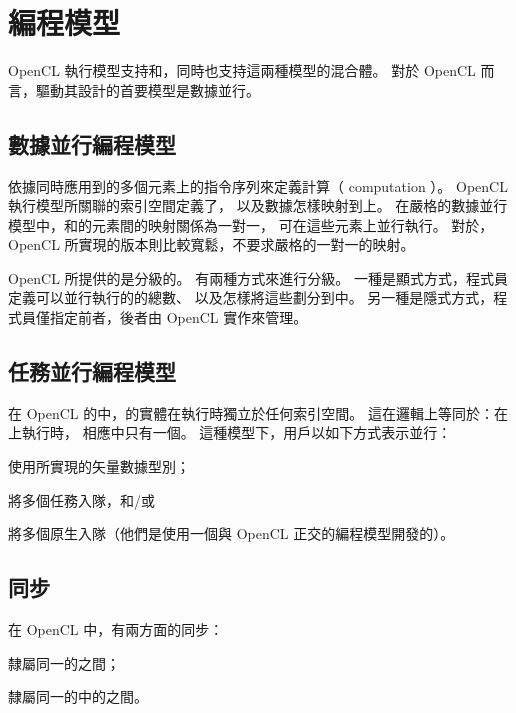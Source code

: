 \section{編程模型}
OpenCL 執行模型支持和，同時也支持這兩種模型的混合體。
對於 OpenCL 而言，驅動其設計的首要模型是數據並行。

\subsection{數據並行編程模型}

依據同時應用到的多個元素上的指令序列來定義計算（ computation ）。
OpenCL 執行模型所關聯的索引空間定義了，
以及數據怎樣映射到上。
在嚴格的數據並行模型中，和的元素間的映射關係為一對一，
可在這些元素上並行執行。
對於，OpenCL 所實現的版本則比較寬鬆，不要求嚴格的一對一的映射。

OpenCL 所提供的是分級的。
有兩種方式來進行分級。
一種是顯式方式，程式員定義可以並行執行的的總數、
以及怎樣將這些劃分到中。
另一種是隱式方式，程式員僅指定前者，後者由 OpenCL 實作來管理。

\subsection{任務並行編程模型}
在 OpenCL 的中，的實體在執行時獨立於任何索引空間。
這在邏輯上等同於：在上執行時，
相應中只有一個。
這種模型下，用戶以如下方式表示並行：
\startigBase
\item 使用所實現的矢量數據型別；
\item 將多個任務入隊，和/或
\item 將多個原生入隊（他們是使用一個與 OpenCL 正交的編程模型開發的）。
\stopigBase

\subsection{同步}
在 OpenCL 中，有兩方面的同步：
\startigBase
\item 隸屬同一的之間；
\item 隸屬同一的中的之間。
\stopigBase

